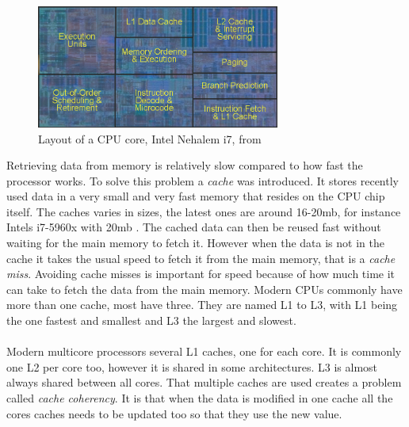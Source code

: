 \documentclass[10pt,a4paper]{report}
\begin{document}
\begin{figure}[h]
    \centering
    \includegraphics[width=8cm]{cpu_core_die.png}
    \caption{Layout of a CPU core, Intel Nehalem i7, from \cite{tomshardware_nehalem}}
    \label{fig:core_die}
\end{figure}

Retrieving data from memory is relatively slow compared to how fast the processor works\cite{introduction_hpc_hager,drepper2007cpumemory}. %
To solve this problem a \emph{cache} was introduced\cite{drepper2007cpumemory}. It stores recently used data in a very small and very fast memory that resides on the CPU chip itself\cite{drepper2007cpumemory}. The caches varies in sizes, the latest ones are around 16-20mb, for instance Intels i7-5960x with 20mb \cite{intel_haswell_2014_5960x}. The cached data can then be reused fast without waiting for the main memory to fetch it. However when the data is not in the cache it takes the usual speed to fetch it from the main memory, that is a \emph{cache miss}\cite{drepper2007cpumemory}. Avoiding cache misses is important for speed because of how much time it can take to fetch the data from the main memory\cite{drepper2007cpumemory}. Modern CPUs commonly have more than one cache, most have three\cite{introduction_hpc_hager}. They are named L1 to L3, with L1 being the one fastest and smallest and L3 the largest and slowest\cite{introduction_hpc_hager}.\\
\\
Modern multicore processors several L1 caches, one for each core\cite{introduction_hpc_hager}. It is commonly one L2 per core too, however it is shared in some architectures\cite{introduction_hpc_hager}. L3 is almost always shared between all cores\cite{introduction_hpc_hager}. That multiple caches are used creates a problem called \emph{cache coherency}. It is that when the data is modified in one cache all the cores caches needs to be updated too so that they use the new value\cite{introduction_hpc_hager}.\\
\\
\end{document}
